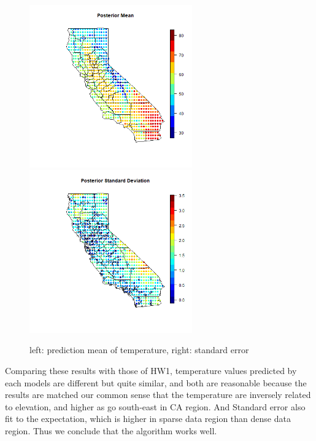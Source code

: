 \documentclass{article}
\begin{document}
\begin{figure}[!h]
    \centering
    \includegraphics[height=7cm]{prob2_posterior.png}
    \includegraphics[height=7cm]{prob2_posterior_SE.png}
    \caption{left: prediction mean of temperature, right: standard error}
\end{figure}

Comparing these results with those of HW1, temperature values predicted by each models
are different but quite similar, and both are reasonable because the results are matched 
our common sense that the temperature are inversely related to elevation, 
and higher as go south-east in CA region.
And Standard error also fit to the expectation, which is higher in sparse data region than
dense data region.
Thus we conclude that the algorithm works well.
\end{document}
